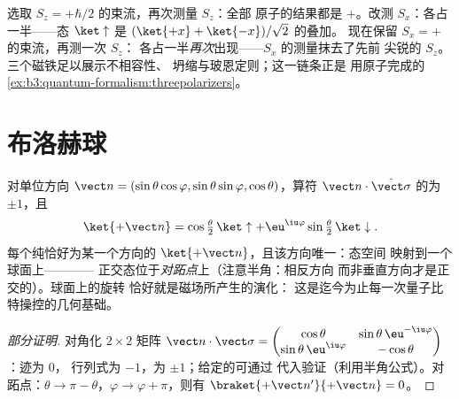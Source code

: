 \begin{example}\label{ex:b3:spin-two-level:chained}
选取 $S_z = +\hbar/2$ 的束流，再次测量 $S_z$：全部
原子的结果都是 $+$。改测 $S_x$：各占一半——态
$\ket\uparrow$ 是 $(\ket{+x} + \ket{-x})/\sqrt2$ 的叠加。
现在保留 $S_x = +$ 的束流，再测一次 $S_z$：
各占一半\emph{再次}出现——$S_x$ 的测量抹去了先前
尖锐的 $S_z$。三个磁铁足以展示不相容性、
坍缩与玻恩定则；这一链条正是
用原子完成的\cref{ex:b3:quantum-formalism:threepolarizers}。
\end{example}

\section{布洛赫球}

\begin{proposition}[沿任意轴的自旋]\label{prop:b3:spin-two-level:bloch}
对单位方向 $\vect n = (\sin\theta\cos\varphi,
\sin\theta\sin\varphi, \cos\theta)$，算符 $\vect
n\cdot\hat{\vect\sigma}$ 的为 $\pm1$，且
\[
\ket{+\vect n} = \cos\tfrac\theta2\,\ket\uparrow +
\eu^{\iu\varphi}\sin\tfrac\theta2\,\ket\downarrow .
\]
每个纯恰好为某一个方向的 $\ket{+\vect n}$，且该方向唯一：态空间
映射到一个球面上——\emph{}——
正交态位于\emph{对跖点}上（注意半角：相反方向
而非垂直方向才是正交的）。球面上的旋转
恰好就是磁场所产生的演化：
这是迄今为止每一次量子比特操控的几何基础。
\end{proposition}

\begin{proof}[部分证明]
对角化 $2\times2$ 矩阵 $\vect n\cdot\vect\sigma =
\begin{pmatrix}\cos\theta & \sin\theta\,\eu^{-\iu\varphi}\\
\sin\theta\,\eu^{\iu\varphi} & -\cos\theta\end{pmatrix}$：迹为 $0$，
行列式为 $-1$，为 $\pm1$；给定的可通过
代入验证（利用半角公式）。对跖点：$\theta \to \pi -
\theta$，$\varphi \to \varphi + \pi$，则有 $\braket{+\vect
n'}{+\vect n} = 0$。
\end{proof}

